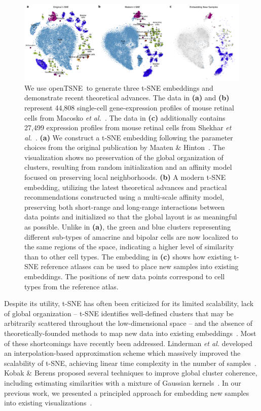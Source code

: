 \documentclass[letter]{article}
\newcommand{\opentsne}{\textsf{openTSNE}}
\begin{document}
\begin{figure}[htbp]
  \includegraphics[width=\textwidth]{macosko2015}
  \caption{\label{fig:macosko}
  We use \opentsne\ to generate three t-SNE embeddings and demonstrate recent
  theoretical advances. The data in \textbf{(a)} and \textbf{(b)} represent 44,808
  single-cell gene-expression profiles of mouse retinal cells from Macosko
  \textit{et al.}~\cite{macosko2015highly}. The data in \textbf{(c)}
  additionally contains 27,499 expression profiles from mouse
  retinal cells from Shekhar \textit{et al.}~\cite{shekhar2016comprehensive}.
  \textbf{(a)} We construct a t-SNE
  embedding following the parameter choices from the original publication
  by Maaten \& Hinton~\cite{maaten2008visualizing}. The visualization
  shows no preservation of the global organization of clusters,
  resulting from random initialization and an affinity model focused on
  preserving local neighborhoods. \textbf{(b)} A modern t-SNE
  embedding, utilizing the latest theoretical advances and practical
  recommendations constructed using a multi-scale
  affinity model, preserving both short-range and long-range interactions
  between data points and initialized so that the global layout is
  as meaningful as possible. Unlike in \textbf{(a)}, the green and blue clusters
  representing different sub-types of amacrine and bipolar cells are now
  localized to the same regions of the space, indicating a higher level
  of similarity than to other cell types. The embedding in \textbf{(c)} shows how existing
  t-SNE reference atlases can be used to place new samples into existing
  embeddings. The positions of new data points correspond to cell types
  from the reference atlas.
}
\end{figure}

Despite its utility, t-SNE has often been criticized for its limited
scalability, lack of global organization -- t-SNE identifies well-defined clusters that
may be arbitrarily scattered throughout the low-dimensional space -- and the absence of
theoretically-founded methods to map new data into existing
embeddings~\cite{ding2018interpretable,becht2019dimensionality}. Most of these
shortcomings have recently been addressed. Linderman \textit{et al.} developed
an interpolation-based approximation scheme which massively improved the
scalability of t-SNE, achieving linear time complexity
in the number of samples~\cite{linderman2019fast}. Kobak \& Berens proposed
several techniques to improve global cluster coherence, including estimating
similarities with a mixture of Gaussian kernels~\cite{kobak2019art}. In our
previous work, we presented a principled approach for embedding new samples into
existing visualizations~\cite{policar2019embedding}.
\end{document}
